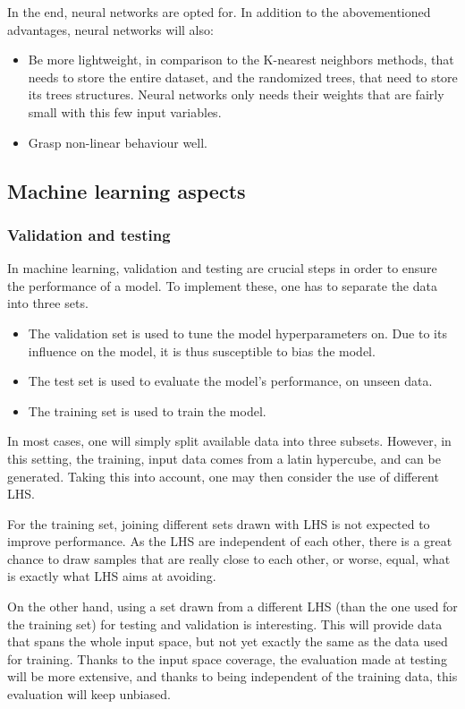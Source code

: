 In the end, neural networks are opted for. In addition to the abovementioned advantages, neural networks will also:
\begin{itemize}
    \item Be more lightweight, in comparison to the K-nearest neighbors methods, that needs to store the entire dataset, and the randomized trees, that need to store its trees structures. Neural networks only needs their weights that are fairly small with this few input variables.
    \item Grasp non-linear behaviour well.
\end{itemize}

\subsection{Machine learning aspects}

\subsubsection{Validation and testing\label{ssec:val-testing}}

In machine learning, validation and testing are crucial steps in order to ensure the performance of a model. To implement these, one has to separate the data into three sets.

\begin{itemize}
    \item The validation set is used to tune the model hyperparameters on. Due to its influence on the model, it is thus susceptible to bias the model.
    \item The test set is used to evaluate the model's performance, on unseen data.
    \item The training set is used to train the model.
\end{itemize}

In most cases, one will simply split available data into three subsets. However, in this setting, the training, input data comes from a latin hypercube, and can be generated. Taking this into account, one may then consider the use of different LHS.

For the training set, joining different sets drawn with LHS is not expected to improve performance. As the LHS are independent of each other, there is a great chance to draw samples that are really close to each other, or worse, equal, what is exactly what LHS aims at avoiding.

On the other hand, using a set drawn from a different LHS (than the one used for the training set) for testing and validation is interesting. This will provide data that spans the whole input space, but not yet exactly the same as the data used for training. Thanks to the input space coverage, the evaluation made at testing will be more extensive, and thanks to being independent of the training data, this evaluation will keep unbiased.

